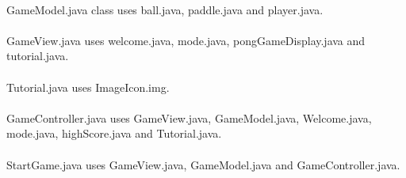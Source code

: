 \documentclass[12pt,letterpaper]{article}
\begin{document}
\paragraph{} GameModel.java class uses ball.java, paddle.java and player.java.
\paragraph{} GameView.java uses welcome.java, mode.java, pongGameDisplay.java and tutorial.java.
\paragraph{} Tutorial.java uses ImageIcon.img.
\paragraph{} GameController.java uses GameView.java, GameModel.java, Welcome.java, mode.java, highScore.java and Tutorial.java.
\paragraph{} StartGame.java uses GameView.java, GameModel.java and GameController.java.
\end{document}
